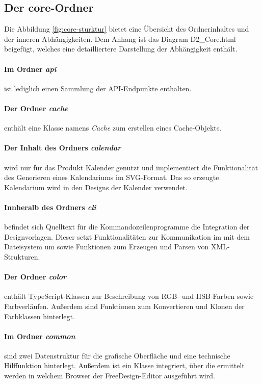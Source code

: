 \subsection{Der core-Ordner}
Die Abbildung \ref{fig:core-sturktur} bietet eine Übersicht des Ordnerinhaltes und der inneren Abhängigkeiten.
Dem Anhang ist das Diagram D2\_Core.html beigefügt, welches eine detailliertere Darstellung der Abhängigkeit enthält.

\paragraph{Im Ordner \emph{api}} ist lediglich einen Sammlung der API-Endpunkte enthalten.

\paragraph{Der Ordner \emph{cache}} enthält eine Klasse namens \emph{Cache} zum erstellen eines Cache-Objekts. 

\paragraph{Der Inhalt des Ordners \emph{calendar}} wird nur für das Produkt Kalender genutzt und implementiert die Funktionalität des Generieren eines Kalendariums im SVG-Format. Das so erzeugte Kalendarium wird in den Designs der Kalender verwendet.

\paragraph{Innheralb des Ordners \emph{cli}} befindet sich Quelltext für die Kommandozeilenprogramme die Integration der Designvorlagen. Dieser setzt Funktionalitäten zur Kommunikation im mit dem Dateisystem um sowie Funktionen zum Erzeugen und Parsen von XML-Strukturen.

\paragraph{Der Ordner \emph{color}} enthält TypeScript-Klassen zur Beschreibung von RGB- und HSB-Farben sowie Farbverläufen. Außerdem sind Funktionen zum Konvertieren und Klonen der Farbklassen hinterlegt. 

\paragraph{Im Ordner \emph{common}} sind zwei Datenstruktur für die grafische Oberfläche und eine technische Hilffunktion hinterlegt. Außerdem ist ein Klasse integriert, über die ermittelt werden in welchem Browser der FreeDesign-Editor ausgeführt wird.

